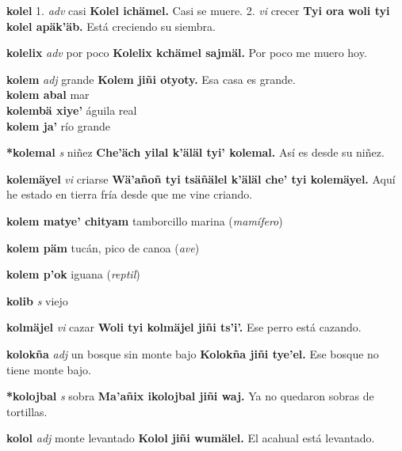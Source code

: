 \documentclass[10pt]{scrbook}
\newcommand{\entry}[1]{\textbf{#1}}
\newcommand{\onedefinition}[1]{#1.}
\newcommand{\partofspeech}[1]{\textit{#1}}
\newcommand{\spanishtranslation}[1]{#1}
\newcommand{\clarification}[1]{(\textit{#1})}
\newcommand{\cholexample}[1]{\textbf{#1}}
\newcommand{\exampletranslation}[1]{#1}
\newcommand{\secondaryentry}[1]{\\\textbf{#1}}
\newcommand{\secondtranslation}[1]{#1}
\begin{document}
\begin{multicols}{2}
\entry{kolel}
\onedefinition{1}
\partofspeech{adv}
\spanishtranslation{casi}
\cholexample{Kolel ichämel.}
\exampletranslation{Casi se muere.}
\onedefinition{2}
\partofspeech{vi}
\spanishtranslation{crecer}
\cholexample{Tyi ora woli tyi kolel apäk'äb.}
\exampletranslation{Está creciendo su siembra.}

\entry{kolelix}
\partofspeech{adv}
\spanishtranslation{por poco}
\cholexample{Kolelix kchämel sajmäl.}
\exampletranslation{Por poco me muero hoy.}

\entry{kolem}
\partofspeech{adj}
\spanishtranslation{grande}
\cholexample{Kolem jiñi otyoty.}
\exampletranslation{Esa casa es grande.}
\secondaryentry{kolem abal}
\secondtranslation{mar}
\secondaryentry{kolembä xiye'}
\secondtranslation{águila real}
\secondaryentry{kolem ja'}
\secondtranslation{río grande}

\entry{*kolemal}
\partofspeech{s}
\spanishtranslation{niñez}
\cholexample{Che'äch yilal k'äläl tyi' kolemal.}
\exampletranslation{Así es desde su niñez.}

\entry{kolemäyel}
\partofspeech{vi}
\spanishtranslation{criarse}
\cholexample{Wä'añoñ tyi tsäñälel k'äläl che' tyi kolemäyel.}
\exampletranslation{Aquí he estado en tierra fría desde que me vine criando.}

\entry{kolem matye' chityam}
\spanishtranslation{tamborcillo}
\spanishtranslation{marina}
\clarification{mamífero}

\entry{kolem päm}
\spanishtranslation{tucán, pico de canoa}
\clarification{ave}

\entry{kolem p'ok}
\spanishtranslation{iguana}
\clarification{reptil}

\entry{kolib}
\partofspeech{s}
\spanishtranslation{viejo}

\entry{kolmäjel}
\partofspeech{vi}
\spanishtranslation{cazar}
\cholexample{Woli tyi kolmäjel jiñi ts'i'.}
\exampletranslation{Ese perro está cazando.}

\entry{kolokña}
\partofspeech{adj}
\spanishtranslation{un bosque sin monte bajo}
\cholexample{Kolokña jiñi tye'el.}
\exampletranslation{Ese bosque no tiene monte bajo.}

\entry{*kolojbal}
\partofspeech{s}
\spanishtranslation{sobra}
\cholexample{Ma'añix ikolojbal jiñi waj.}
\exampletranslation{Ya no quedaron sobras de tortillas.}

\entry{kolol}
\partofspeech{adj}
\spanishtranslation{monte levantado}
\cholexample{Kolol jiñi wumälel.}
\exampletranslation{El acahual está levantado.}


\end{multicols}
\end{document}
